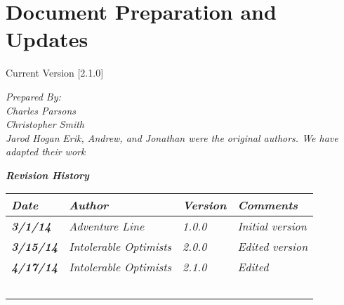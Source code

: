 
\chapter{Document Preparation and Updates}

Current Version [2.1.0]
\vspace*{5mm}

{\color{MSBlue3}
\noindent
\textit{Prepared By:}\\
\textit{Charles Parsons}\\
\textit{Christopher Smith}\\
\textit{Jarod Hogan}
\textit{Erik, Andrew, and Jonathan were the original authors. We have adapted their work}\\
}

\vfill
\noindent
{\color{color02} \textit{\textbf{Revision History}}}\\
\begin{tabular}{|>{\raggedright}p{1.5cm}|>{\raggedright}p{3cm}|>{\raggedright}p{1.5cm}|>{\raggedright}p{9cm}|}
\hline
\textit{\textbf{Date}} &  \textit{\textbf{Author}} & \textit{\textbf{Version}} & \textit{\textbf{Comments}}\tabularnewline
\hline
 \textit{\textbf{3/1/14}} & \textit{Adventure Line} & \textit{1.0.0} & \textit{Initial version}\tabularnewline
\hline
\textit{\textbf{3/15/14}} & \textit{Intolerable Optimists} & \textit{2.0.0} & \textit{Edited version}\tabularnewline
\hline
\textit{\textbf{4/17/14}} & \textit{Intolerable Optimists} & \textit{2.1.0} & \textit{Edited}\tabularnewline
\hline
 &  &  & \tabularnewline
 \hline
 &  &  & \tabularnewline
\hline
 &  &  & \tabularnewline
\hline
 &  &  & \tabularnewline
\hline
 &  &  & \tabularnewline
\hline
\end{tabular}
\vfill

